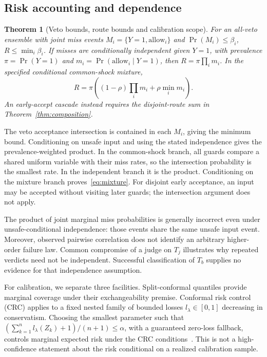 \documentclass[lettersize,journal]{IEEEtran}
\newtheorem{theorem}{Theorem}
\begin{document}
\subsection{Risk accounting and dependence}
\begin{theorem}[Veto bounds, route bounds and calibration scope]
\label{thm:bounds}
For an all-veto ensemble with joint miss events
$M_i=\{Y=1,\mathrm{allow}_i\}$ and $\Pr(M_i)\leq\beta_i$,
$R\leq\min_i\beta_i$. If misses are conditionally independent given $Y=1$,
with prevalence $\pi=\Pr(Y=1)$ and
$m_i=\Pr(\mathrm{allow}_i\mid Y=1)$, then
$R=\pi\prod_i m_i$. In the specified conditional common-shock mixture,
\begin{equation}
R=\pi\left((1-\rho)\prod_i m_i+\rho\min_i m_i\right).
\label{eq:mixture}
\end{equation}
An early-accept cascade instead requires the disjoint-route sum in
Theorem~\ref{thm:composition}.
\end{theorem}
\begin{IEEEproof}
The veto acceptance intersection is contained in each $M_i$, giving the
minimum bound. Conditioning on unsafe input and using the stated independence
gives the prevalence-weighted product. In the common-shock branch, all guards
compare a shared uniform variable with their miss rates, so the intersection
probability is the smallest rate. In the independent branch it is the product.
Conditioning on the mixture branch proves~\eqref{eq:mixture}. For disjoint
early acceptance, an input may be accepted without visiting later guards;
the intersection argument does not apply.
\end{IEEEproof}

The product of joint marginal miss probabilities is generally incorrect even
under unsafe-conditional independence: those events share the same unsafe
input event. Moreover, observed pairwise correlation does not identify an
arbitrary higher-order failure law. Common compromise of a judge on $T_j$
illustrates why repeated verdicts need not be independent. Successful
classification of $T_b$ supplies no evidence for that independence assumption.

For calibration, we separate three facilities. Split-conformal quantiles
provide marginal coverage under their exchangeability premise. Conformal risk
control (CRC) applies to a fixed nested family of bounded losses
$l_\lambda\in[0,1]$ decreasing in conservatism. Choosing the smallest parameter
such that $(\sum_{k=1}^n l_\lambda(Z_k)+1)/(n+1)\leq\alpha$, with a guaranteed
zero-loss fallback, controls marginal expected risk under the CRC
conditions~\cite{arxiv220802814}. This is not a high-confidence statement about
the risk conditional on a realized calibration sample.
\end{document}

